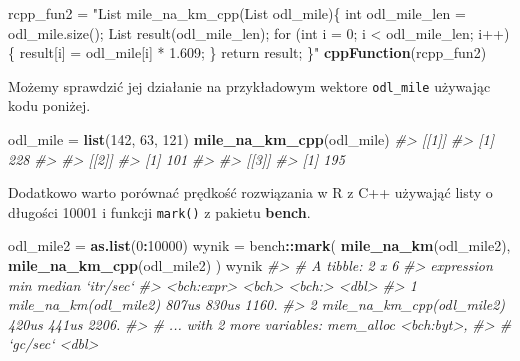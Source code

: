 \documentclass[paper=6in:9in,pagesize=pdftex,headinclude=on,footinclude=on,10pt]{scrbook}
\newenvironment{Shaded}{\begin{snugshade}}{\end{snugshade}}
\newcommand{\CommentTok}[1]{\textcolor[rgb]{0.56,0.35,0.01}{\textit{#1}}}
\newcommand{\DecValTok}[1]{\textcolor[rgb]{0.00,0.00,0.81}{#1}}
\newcommand{\KeywordTok}[1]{\textcolor[rgb]{0.13,0.29,0.53}{\textbf{#1}}}
\newcommand{\NormalTok}[1]{#1}
\newcommand{\OperatorTok}[1]{\textcolor[rgb]{0.81,0.36,0.00}{\textbf{#1}}}
\newcommand{\StringTok}[1]{\textcolor[rgb]{0.31,0.60,0.02}{#1}}
\begin{document}
\begin{Shaded}
\begin{Highlighting}[]
\NormalTok{rcpp_fun2 =}\StringTok{ "List mile_na_km_cpp(List odl_mile)\{}
\StringTok{  int odl_mile_len = odl_mile.size();}
\StringTok{  List result(odl_mile_len);}
\StringTok{  for (int i = 0; i < odl_mile_len; i++)\{}
\StringTok{    result[i] = odl_mile[i] * 1.609;}
\StringTok{  \}}
\StringTok{  return result;}
\StringTok{\}"}
\KeywordTok{cppFunction}\NormalTok{(rcpp_fun2)}
\end{Highlighting}
\end{Shaded}

Możemy sprawdzić jej działanie na przykładowym wektore \texttt{odl\_mile} używając kodu poniżej.

\begin{Shaded}
\begin{Highlighting}[]
\NormalTok{odl_mile =}\StringTok{ }\KeywordTok{list}\NormalTok{(}\DecValTok{142}\NormalTok{, }\DecValTok{63}\NormalTok{, }\DecValTok{121}\NormalTok{)}
\KeywordTok{mile_na_km_cpp}\NormalTok{(odl_mile)}
\CommentTok{#> [[1]]}
\CommentTok{#> [1] 228}
\CommentTok{#> }
\CommentTok{#> [[2]]}
\CommentTok{#> [1] 101}
\CommentTok{#> }
\CommentTok{#> [[3]]}
\CommentTok{#> [1] 195}
\end{Highlighting}
\end{Shaded}

Dodatkowo warto porównać prędkość rozwiązania w R z C++ używająć listy o długości 10001 i funkcji \texttt{mark()} z pakietu \textbf{bench}.

\begin{Shaded}
\begin{Highlighting}[]
\NormalTok{odl_mile2 =}\StringTok{ }\KeywordTok{as.list}\NormalTok{(}\DecValTok{0}\OperatorTok{:}\DecValTok{10000}\NormalTok{)}
\NormalTok{wynik =}\StringTok{ }\NormalTok{bench}\OperatorTok{::}\KeywordTok{mark}\NormalTok{(}
  \KeywordTok{mile_na_km}\NormalTok{(odl_mile2),}
  \KeywordTok{mile_na_km_cpp}\NormalTok{(odl_mile2)}
\NormalTok{)}
\NormalTok{wynik}
\CommentTok{#> # A tibble: 2 x 6}
\CommentTok{#>   expression                  min median `itr/sec`}
\CommentTok{#>   <bch:expr>                <bch> <bch:>     <dbl>}
\CommentTok{#> 1 mile_na_km(odl_mile2)     807us  830us     1160.}
\CommentTok{#> 2 mile_na_km_cpp(odl_mile2) 420us  441us     2206.}
\CommentTok{#> # ... with 2 more variables: mem_alloc <bch:byt>,}
\CommentTok{#> #   `gc/sec` <dbl>}
\end{Highlighting}
\end{Shaded}
\end{document}
